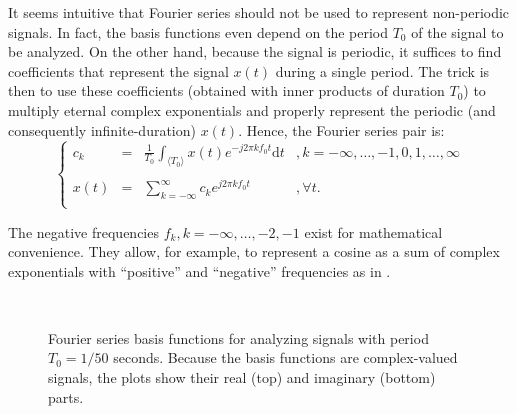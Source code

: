 It seems intuitive that Fourier series should not be used to represent non-periodic signals. In fact, the basis functions even depend on the period $T_0$ of the signal to be analyzed. On the other hand, because the signal is periodic, it suffices to find coefficients that represent the signal $x(t)$ during a single period. The trick is then to use these coefficients (obtained with inner products of duration $T_0$) to multiply eternal complex exponentials and properly represent the periodic (and consequently infinite-duration) $x(t)$. Hence, the Fourier series pair is:
\begin{equation}
\left\{
\begin{array}{llll}
c_k  &=&  \frac{1}{T_0} \int_{\langle T_0\rangle} x(t) e^{- j 2 \pi k f_0 t} \textrm{d}t  & ,  k=-\infty,\ldots,-1,0,1,\ldots,\infty   \\
& & &  \\
x(t) &=& \sum_{k=-\infty}^\infty c_k e^{j 2 \pi k f_0 t}   & ,  \forall t.
\label{eq:fourier_series}
\\ \end{array}
\right.  %
\end{equation}


The negative frequencies $f_k, k=-\infty,\ldots,-2,-1$ exist for mathematical convenience.
They allow, for example, to represent a cosine as a sum of complex exponentials with ``positive'' and ``negative'' frequencies as in . %

\begin{figure}[!htb]
  \begin{center}
    \\
  \end{center}
  \caption{Fourier series basis functions for analyzing signals with period $T_0 = 1/50$ seconds. Because the basis functions are complex-valued signals, the plots show their real (top) and imaginary (bottom) parts.}
  \label{fig:complexexponentials}
\end{figure}

